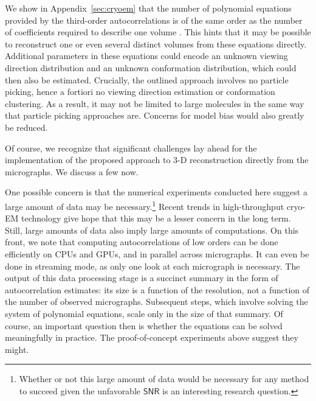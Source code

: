 \documentclass[english,11pt]{article}
\newcommand{\1}{\mathbf{1}}
\newcommand{\TODO}[1]{{\color{red}{[#1]}}}
\numberwithin{equation}{section}
\theoremstyle{plain}
\theoremstyle{definition}
\theoremstyle{remark}
\theoremstyle{plain}
\theoremstyle{remark}
\theoremstyle{plain}
\theoremstyle{plain}
\newcommand{\SNR}{\ensuremath{\textsf{SNR}}}
\begin{document}
We show in Appendix~\ref{sec:cryoem} that the number of polynomial equations provided by the third-order autocorrelations is of the same order as the number of coefficients required to describe one volume \TODO{at resolution comparable to that of the particle projections---remove?}. This hints that it may be possible to reconstruct one or even several distinct volumes from these equations directly. Additional parameters in these equations could encode an unknown viewing direction distribution and an unknown conformation distribution, which could then also be estimated. Crucially, the outlined approach involves no particle picking, hence a fortiori no viewing direction estimation or conformation clustering. As a result, it may not be limited to large molecules in the same way that particle picking approaches are. Concerns for model bias would also greatly be reduced.



Of course, we recognize that significant challenges lay ahead for the implementation of the proposed approach to 3-D reconstruction directly from the micrographs. We discuss a few now.

One possible concern is that the numerical experiments conducted here suggest a large amount of data may be necessary.\footnote{Whether or not this large amount of data would be necessary for any method to succeed given the unfavorable $\SNR$ is an interesting research question.} Recent trends in high-throughput cryo-EM technology \TODO{?} give hope that this may be a lesser concern in the long term. Still, large amounts of data also imply large amounts of computations. On this front, we note that computing autocorrelations of low orders can be done efficiently on CPUs and GPUs, and in parallel across micrographs. It can even be done in streaming mode, as only one look at each micrograph is necessary. The output of this data processing stage is a succinct summary in the form of autocorrelation estimates: its size is a function of the resolution, not a function of the number of observed micrographs. Subsequent steps, which involve solving the system of polynomial equations, scale only in the size of that summary. Of course, an important question then is whether the equations can be solved meaningfully in practice. The proof-of-concept experiments above suggest they might.
\end{document}
